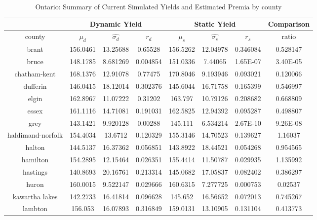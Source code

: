 \begin{table}[H]\centering
\caption{Ontario: Summary of Current Simulated Yields and Estimated Premia by county}
\begin{tabular}{|c|ccc|ccc|c|}

\hline
\multicolumn{1}{|c}{} & \multicolumn{3}{|c}{Dynamic Yield} & \multicolumn{3}{|c}{Static Yield} & \multicolumn{1}{|c|}{Comparison}\\ 
\hline
county        & $\mu_d$ & $\hat{\sigma_d}$ & $r_d$ & $\mu_s$ & $\hat{\sigma_s}$ & $r_s$ & ratio \\
\hline

brant                     & 156.0461 & 13.25688 & 0.65528  & 156.5262 & 12.04978 & 0.346084 & 0.528147 \\
bruce                     & 148.1785 & 8.681269 & 0.004854 & 151.0336 & 7.44065  & 1.65E-07 & 3.40E-05 \\
chatham-kent              & 168.1376 & 12.91078 & 0.77475  & 170.8046 & 9.193946 & 0.093021 & 0.120066 \\
dufferin                  & 146.0415 & 18.12014 & 0.302376 & 145.6044 & 16.71758 & 0.165399 & 0.546997 \\
elgin                     & 162.8967 & 11.07222 & 0.31202  & 163.797  & 10.79126 & 0.208682 & 0.668809 \\
essex                     & 161.1116 & 14.71081 & 0.191031 & 162.5825 & 12.94392 & 0.095287 & 0.498807 \\
grey                      & 143.1421 & 9.920128 & 0.00288  & 145.111  & 6.534214 & 2.67E-10 & 9.26E-08 \\
haldimand-norfolk         & 154.4034 & 13.6712  & 0.120329 & 155.3146 & 14.70523 & 0.139627 & 1.16037  \\
halton                    & 144.5137 & 16.37362 & 0.056851 & 143.8922 & 18.44521 & 0.054268 & 0.954565 \\
hamilton                  & 154.2895 & 12.15464 & 0.026351 & 155.4414 & 11.50787 & 0.029935 & 1.135992 \\
hastings                  & 140.8693 & 20.16761 & 0.213314 & 145.0682 & 17.05837 & 0.082402 & 0.386297 \\
huron                     & 160.0015 & 9.522147 & 0.029666 & 160.6315 & 7.277725 & 0.000753 & 0.02537  \\
kawartha lakes            & 142.2733 & 16.41814 & 0.096628 & 145.652  & 16.56652 & 0.072013 & 0.745267 \\
lambton                   & 156.053  & 16.07893 & 0.316849 & 159.0131 & 13.10905 & 0.131104 & 0.413773 \\

\end{tabular}
\end{table}
